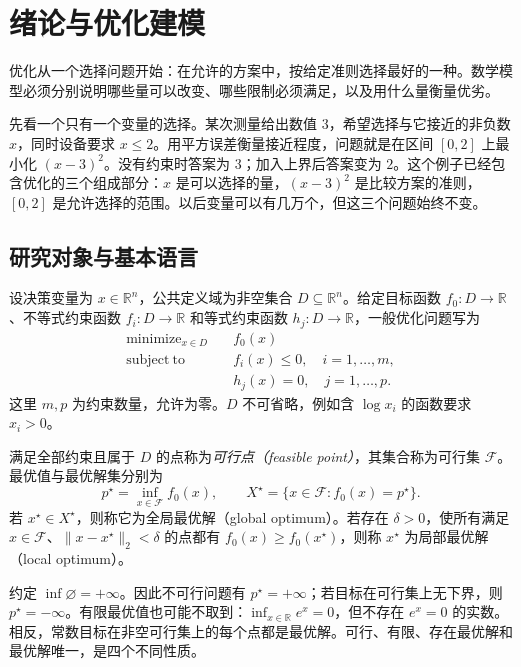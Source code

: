 \setcounter{chapter}{0} %
\chapter{绪论与优化建模}
\label{ch:co-introduction}

优化从一个选择问题开始：在允许的方案中，按给定准则选择最好的一种。数学模型必须分别说明哪些量可以改变、哪些限制必须满足，以及用什么量衡量优劣。

先看一个只有一个变量的选择。某次测量给出数值 $3$，希望选择与它接近的非负数 $x$，同时设备要求 $x\leq2$。用平方误差衡量接近程度，问题就是在区间 $[0,2]$ 上最小化 $(x-3)^2$。没有约束时答案为 $3$；加入上界后答案变为 $2$。这个例子已经包含优化的三个组成部分：$x$ 是可以选择的量，$(x-3)^2$ 是比较方案的准则，$[0,2]$ 是允许选择的范围。以后变量可以有几万个，但这三个问题始终不变。

\section{研究对象与基本语言}

设决策变量为 $x\in\mathbb R^n$，公共定义域为非空集合 $D\subseteq\mathbb R^n$。给定目标函数 $f_0:D\to\mathbb R$、不等式约束函数 $f_i:D\to\mathbb R$ 和等式约束函数 $h_j:D\to\mathbb R$，一般优化问题写为
\begin{equation}
 \begin{aligned}
 \mathop{\mathrm{minimize}}_{x\in D}\quad &f_0(x)\\
 \mathrm{subject\ to}\quad &f_i(x)\leq0,\quad i=1,\ldots,m,\\
 &h_j(x)=0,\quad j=1,\ldots,p.
 \end{aligned}
 \label{eq:co-general-problem}
\end{equation}
这里 $m,p$ 为约束数量，允许为零。$D$ 不可省略，例如含 $\log x_i$ 的函数要求 $x_i>0$。

\begin{definition}
满足全部约束且属于 $D$ 的点称为\emph{可行点（feasible point）}，其集合称为可行集 $\mathcal F$。最优值与最优解集分别为
\[
 p^\star=\inf_{x\in\mathcal F}f_0(x),\qquad
 X^\star=\{x\in\mathcal F:f_0(x)=p^\star\}.
\]
若 $x^\star\in X^\star$，则称它为全局最优解（global optimum）。若存在 $\delta>0$，使所有满足 $x\in\mathcal F$、$\|x-x^\star\|_2<\delta$ 的点都有 $f_0(x)\geq f_0(x^\star)$，则称 $x^\star$ 为局部最优解（local optimum）。
\end{definition}

约定 $\inf\varnothing=+\infty$。因此不可行问题有 $p^\star=+\infty$；若目标在可行集上无下界，则 $p^\star=-\infty$。有限最优值也可能不取到：$\inf_{x\in\mathbb R}e^x=0$，但不存在 $e^x=0$ 的实数。相反，常数目标在非空可行集上的每个点都是最优解。可行、有限、存在最优解和最优解唯一，是四个不同性质。

